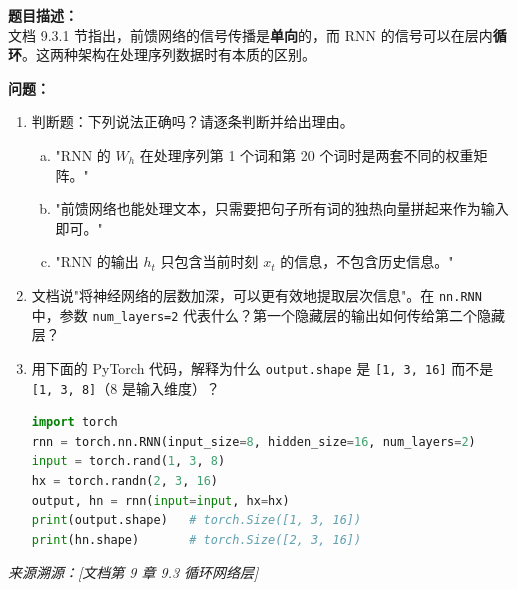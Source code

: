 \documentclass[a4paper,11pt]{ctexart}
\begin{document}
\begin{problembox}
    \textbf{题目描述：}\\
    文档 9.3.1 节指出，前馈网络的信号传播是\textbf{单向}的，而 RNN 的信号可以在层内\textbf{循环}。这两种架构在处理序列数据时有本质的区别。

    \vspace{0.2cm}
    \textbf{问题：}
    \begin{enumerate}[(1)]
        \item 判断题：下列说法正确吗？请逐条判断并给出理由。
        \begin{enumerate}[a.]
            \item "RNN 的 $W_h$ 在处理序列第 1 个词和第 20 个词时是两套不同的权重矩阵。"
            \item "前馈网络也能处理文本，只需要把句子所有词的独热向量拼起来作为输入即可。"
            \item "RNN 的输出 $h_t$ 只包含当前时刻 $x_t$ 的信息，不包含历史信息。"
        \end{enumerate}
        \item 文档说"将神经网络的层数加深，可以更有效地提取层次信息"。在 \texttt{nn.RNN} 中，参数 \texttt{num\_layers=2} 代表什么？第一个隐藏层的输出如何传给第二个隐藏层？
        \item 用下面的 PyTorch 代码，解释为什么 \texttt{output.shape} 是 \texttt{[1, 3, 16]} 而不是 \texttt{[1, 3, 8]}（8 是输入维度）？

        \begin{lstlisting}[language=Python]
import torch
rnn = torch.nn.RNN(input_size=8, hidden_size=16, num_layers=2)
input = torch.rand(1, 3, 8)
hx = torch.randn(2, 3, 16)
output, hn = rnn(input=input, hx=hx)
print(output.shape)   # torch.Size([1, 3, 16])
print(hn.shape)       # torch.Size([2, 3, 16])
        \end{lstlisting}
    \end{enumerate}

    \vspace{0.2cm}
    {\color{gray}\small\textit{来源溯源：[文档第 9 章 9.3 循环网络层]}}
\end{problembox}
\end{document}
